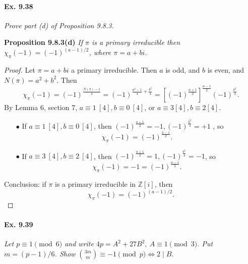\documentclass[11pt,a4paper]{article}
\newcommand{\Z}{\mathbb{Z}}
\begin{document}
\paragraph{Ex. 9.38}

{\it Prove part (d) of Proposition 9.8.3.
}

\bigskip

{\bf Proposition 9.8.3(d)} {\it 
If $\pi$ is a primary irreducible then $\chi_{\pi}(-1)=(-1)^{(a-1)/2}$, where $\pi = a+bi$.}



\begin{proof}
Let $\pi = a + bi$ a primary irreducible. Then $a$ is odd, and $b$ is even, and $N(\pi) = a^2+b^2$. 
Then 
$$\chi_\pi(-1) = (-1)^{\frac{N(\pi)-1}{4}} = (-1)^{\frac{a^2-1}{4}+ \frac{b^2}{4}} = [(-1)^{\frac{a+1}{2}}]^{\frac{a-1}{2}} (-1)^{\frac{b^2}{4}}.$$
By Lemma 6, section 7, $a\equiv 1\ [4], b\equiv 0\ [4]$, or $a \equiv 3 [4], b\equiv 2 [4]$.
\begin{enumerate}
	\item[$\bullet$] If $a\equiv 1\ [4], b\equiv 0\ [4]$, then $(-1)^{\frac{a+1}{2}} = -1, (-1)^{\frac{b^2}{4}}=+1$ , so
	$$\chi_\pi(-1) =(-1)^{\frac{a-1}{2}}.$$
	\item[$\bullet$] If $a \equiv 3 \ [4], b\equiv 2 \ [4]$, then $(-1)^{\frac{a+1}{2}} = 1, (-1)^{\frac{b^2}{4}}=-1$, so
	$$\chi_\pi(-1) =-1 = (-1)^{\frac{a-1}{2}}.$$

\end{enumerate}

Conclusion: if $\pi$ is a primary irreducible in $\Z[i]$, then
$$\chi_{\pi}(-1)=(-1)^{(a-1)/2}.$$
\end{proof} 

\paragraph{Ex. 9.39}

{\it Let $p\equiv 1 \pmod 6$ and write $4p = A^2 + 27 B^2, \ A \equiv 1 \pmod 3$. Put $m=(p-1)/6$. Show $\binom{3m}{m} \equiv -1 \pmod p \iff 2 \mid B$.
}
\end{document}
